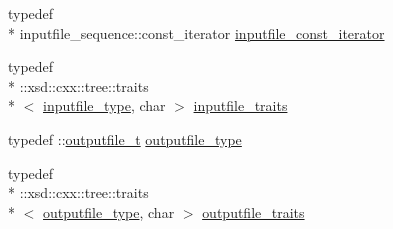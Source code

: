 \begin{DoxyCompactItemize}
typedef \\*
inputfile\-\_\-sequence\-::const\-\_\-iterator \hyperlink{classpse__t_a56e96d807f4fb19912690b53fe95d20b}{inputfile\-\_\-const\-\_\-iterator}
\item 
typedef \\*
\-::xsd\-::cxx\-::tree\-::traits\\*
$<$ \hyperlink{classpse__t_a86a1a849175762d6b2d8d254a694d43c}{inputfile\-\_\-type}, char $>$ \hyperlink{classpse__t_aa1b26e25c5698d3db17f0d9997faec05}{inputfile\-\_\-traits}
\item 
typedef \-::\hyperlink{classoutputfile__t}{outputfile\-\_\-t} \hyperlink{classpse__t_ae86d42dbfdd42a4d53733b6b11b5f875}{outputfile\-\_\-type}
\item 
typedef \\*
\-::xsd\-::cxx\-::tree\-::traits\\*
$<$ \hyperlink{classpse__t_ae86d42dbfdd42a4d53733b6b11b5f875}{outputfile\-\_\-type}, char $>$ \hyperlink{classpse__t_a1ea902d4f686908c24a487b7a16fcb0a}{outputfile\-\_\-traits}
\end{DoxyCompactItemize}
